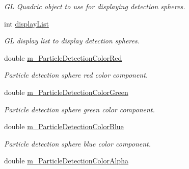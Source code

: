 \begin{DoxyCompactItemize}
\begin{DoxyCompactList}\small\item\em GL Quadric object to use for displaying detection spheres. \end{DoxyCompactList}\item 
\hypertarget{class_cloud_detection_belief_aab2093ec0ef10a7f9f03883ac8827617}{
int \hyperlink{class_cloud_detection_belief_aab2093ec0ef10a7f9f03883ac8827617}{displayList}}
\label{class_cloud_detection_belief_aab2093ec0ef10a7f9f03883ac8827617}

\begin{DoxyCompactList}\small\item\em GL display list to display detection spheres. \end{DoxyCompactList}\item 
\hypertarget{class_cloud_detection_belief_a38c9c32783f1f316a3f3733e1cd70e4c}{
double \hyperlink{class_cloud_detection_belief_a38c9c32783f1f316a3f3733e1cd70e4c}{m\_\-ParticleDetectionColorRed}}
\label{class_cloud_detection_belief_a38c9c32783f1f316a3f3733e1cd70e4c}

\begin{DoxyCompactList}\small\item\em Particle detection sphere red color component. \end{DoxyCompactList}\item 
\hypertarget{class_cloud_detection_belief_adbf87539dcb2860932514c88dbe06151}{
double \hyperlink{class_cloud_detection_belief_adbf87539dcb2860932514c88dbe06151}{m\_\-ParticleDetectionColorGreen}}
\label{class_cloud_detection_belief_adbf87539dcb2860932514c88dbe06151}

\begin{DoxyCompactList}\small\item\em Particle detection sphere green color component. \end{DoxyCompactList}\item 
\hypertarget{class_cloud_detection_belief_a43be602ca973613e828b247a0b4e0e64}{
double \hyperlink{class_cloud_detection_belief_a43be602ca973613e828b247a0b4e0e64}{m\_\-ParticleDetectionColorBlue}}
\label{class_cloud_detection_belief_a43be602ca973613e828b247a0b4e0e64}

\begin{DoxyCompactList}\small\item\em Particle detection sphere blue color component. \end{DoxyCompactList}\item 
\hypertarget{class_cloud_detection_belief_aa6dfb8364f06ffaca7b7fc4ae867c06b}{
double \hyperlink{class_cloud_detection_belief_aa6dfb8364f06ffaca7b7fc4ae867c06b}{m\_\-ParticleDetectionColorAlpha}}
\label{class_cloud_detection_belief_aa6dfb8364f06ffaca7b7fc4ae867c06b}


\end{DoxyCompactItemize}
